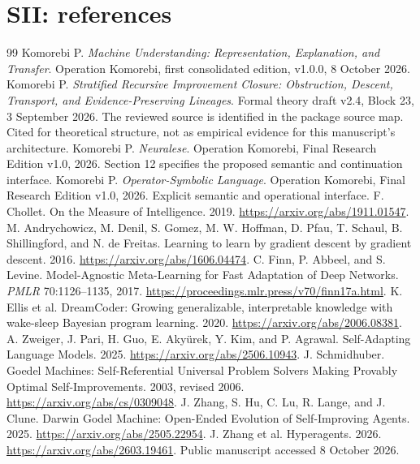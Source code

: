 \documentclass[11pt,oneside,openany]{book}
\numberwithin{equation}{section}
\begin{document}
\chapter{SII: references}
\begin{thebibliography}{99}\fontsize{9.5}{11.2}\selectfont\setlength{\itemsep}{3pt}\setlength{\parskip}{0pt}
 Komorebi P. \emph{Machine Understanding: Representation, Explanation, and Transfer}. Operation Komorebi, first consolidated edition, v1.0.0, 8 October 2026.
 Komorebi P. \emph{Stratified Recursive Improvement Closure: Obstruction, Descent, Transport, and Evidence-Preserving Lineages}. Formal theory draft v2.4, Block 23, 3 September 2026. The reviewed source is identified in the package source map. Cited for theoretical structure, not as empirical evidence for this manuscript's architecture.
 Komorebi P. \emph{Neuralese}. Operation Komorebi, Final Research Edition v1.0, 2026. Section 12 specifies the proposed semantic and continuation interface.
 Komorebi P. \emph{Operator-Symbolic Language}. Operation Komorebi, Final Research Edition v1.0, 2026. Explicit semantic and operational interface.
 F. Chollet. On the Measure of Intelligence. 2019. \url{https://arxiv.org/abs/1911.01547}.
 M. Andrychowicz, M. Denil, S. Gomez, M. W. Hoffman, D. Pfau, T. Schaul, B. Shillingford, and N. de Freitas. Learning to learn by gradient descent by gradient descent. 2016. \url{https://arxiv.org/abs/1606.04474}.
 C. Finn, P. Abbeel, and S. Levine. Model-Agnostic Meta-Learning for Fast Adaptation of Deep Networks. \emph{PMLR} 70:1126--1135, 2017. \url{https://proceedings.mlr.press/v70/finn17a.html}.
 K. Ellis et al. DreamCoder: Growing generalizable, interpretable knowledge with wake-sleep Bayesian program learning. 2020. \url{https://arxiv.org/abs/2006.08381}.
 A. Zweiger, J. Pari, H. Guo, E. Aky\"urek, Y. Kim, and P. Agrawal. Self-Adapting Language Models. 2025. \url{https://arxiv.org/abs/2506.10943}.
 J. Schmidhuber. Goedel Machines: Self-Referential Universal Problem Solvers Making Provably Optimal Self-Improvements. 2003, revised 2006. \url{https://arxiv.org/abs/cs/0309048}.
 J. Zhang, S. Hu, C. Lu, R. Lange, and J. Clune. Darwin Godel Machine: Open-Ended Evolution of Self-Improving Agents. 2025. \url{https://arxiv.org/abs/2505.22954}.
 J. Zhang et al. Hyperagents. 2026. \url{https://arxiv.org/abs/2603.19461}. Public manuscript accessed 8 October 2026.

\end{thebibliography}
\end{document}
